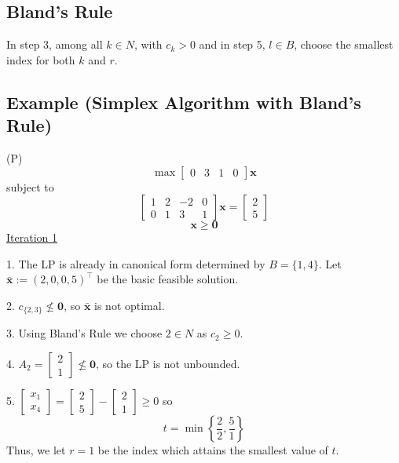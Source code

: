 \begin{thmbox}
    \subsection{Bland's Rule}
    In step 3, among all $k\in N$, with $c_k>0$ and in step 5, $l\in B$, 
    choose the smallest index for both $k$ and $r$.
\end{thmbox}

\subsection{Example (Simplex Algorithm with Bland's Rule)}
(P)
\[ \max
\begin{bmatrix}
    0 & 3 & 1 & 0
\end{bmatrix}\bm{x} \]
subject to
\[ 
\begin{bmatrix}
    1 & 2 & -2 & 0\\
    0 & 1 & 3 & 1
\end{bmatrix}\bm{x}=
\begin{bmatrix}
    2\\
    5
\end{bmatrix} \]
\[ \bm{x}\ge \bm{0} \]
\underline{Iteration 1}

1. The LP is already in canonical form determined by $ B=\{1,4\} $.
Let $ \bm{\bar{x}}:=(2,0,0,5)^\top $ be the basic feasible solution.

2. $ c_{\{2,3\}} \nleq \bm{0} $, so $ \bm{\bar{x}} $ is not optimal.

3. Using Bland's Rule we choose $ 2\in N $ as $ c_2\ge 0 $.

4.
$ 
A_2= \begin{bmatrix}
    2\\
    1
\end{bmatrix}\nleq \bm{0}
$,
so the LP is not unbounded.

5.
$
\begin{bmatrix}
    x_1\\
    x_4
\end{bmatrix}
=
\begin{bmatrix}
    2\\
    5
\end{bmatrix}-
\begin{bmatrix}
    2\\
    1
\end{bmatrix}\ge 0
$
so
\[ t=\min \left\{\frac{2}{2},\frac{5}{1} \right\} \]
Thus, we let $ r=1 $ be the index which attains the smallest value of $ t $.

